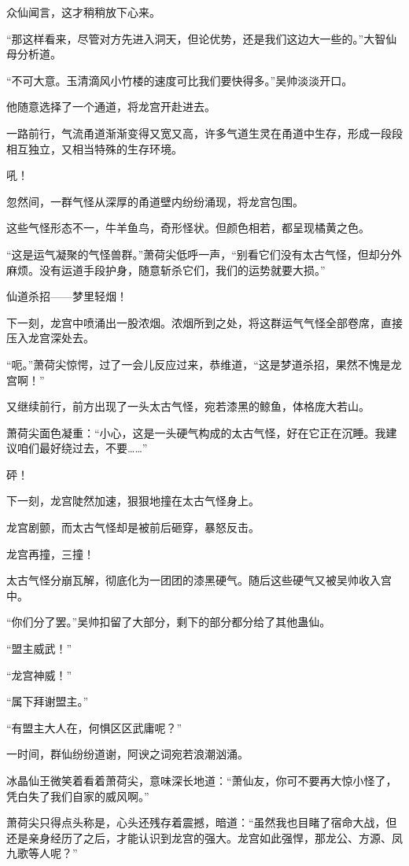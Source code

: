 \begin{this_body}
众仙闻言，这才稍稍放下心来。

“那这样看来，尽管对方先进入洞天，但论优势，还是我们这边大一些的。”大智仙母分析道。

“不可大意。玉清滴风小竹楼的速度可比我们要快得多。”吴帅淡淡开口。

他随意选择了一个通道，将龙宫开赴进去。

一路前行，气流甬道渐渐变得又宽又高，许多气道生灵在甬道中生存，形成一段段相互独立，又相当特殊的生存环境。

吼！

忽然间，一群气怪从深厚的甬道壁内纷纷涌现，将龙宫包围。

这些气怪形态不一，牛羊鱼鸟，奇形怪状。但颜色相若，都呈现橘黄之色。

“这是运气凝聚的气怪兽群。”萧荷尖低呼一声，“别看它们没有太古气怪，但却分外麻烦。没有运道手段护身，随意斩杀它们，我们的运势就要大损。”

仙道杀招——梦里轻烟！

下一刻，龙宫中喷涌出一股浓烟。浓烟所到之处，将这群运气气怪全部卷席，直接压入龙宫深处去。

“呃。”萧荷尖惊愕，过了一会儿反应过来，恭维道，“这是梦道杀招，果然不愧是龙宫啊！”

又继续前行，前方出现了一头太古气怪，宛若漆黑的鲸鱼，体格庞大若山。

萧荷尖面色凝重：“小心，这是一头硬气构成的太古气怪，好在它正在沉睡。我建议咱们最好绕过去，不要……”

砰！

下一刻，龙宫陡然加速，狠狠地撞在太古气怪身上。

龙宫剧颤，而太古气怪却是被前后砸穿，暴怒反击。

龙宫再撞，三撞！

太古气怪分崩瓦解，彻底化为一团团的漆黑硬气。随后这些硬气又被吴帅收入宫中。

“你们分了罢。”吴帅扣留了大部分，剩下的部分都分给了其他蛊仙。

“盟主威武！”

“龙宫神威！”

“属下拜谢盟主。”

“有盟主大人在，何惧区区武庸呢？”

一时间，群仙纷纷道谢，阿谀之词宛若浪潮汹涌。

冰晶仙王微笑着看着萧荷尖，意味深长地道：“萧仙友，你可不要再大惊小怪了，凭白失了我们自家的威风啊。”

萧荷尖只得点头称是，心头还残存着震撼，暗道：“虽然我也目睹了宿命大战，但还是亲身经历了之后，才能认识到龙宫的强大。龙宫如此强悍，那龙公、方源、凤九歌等人呢？”


\end{this_body}
